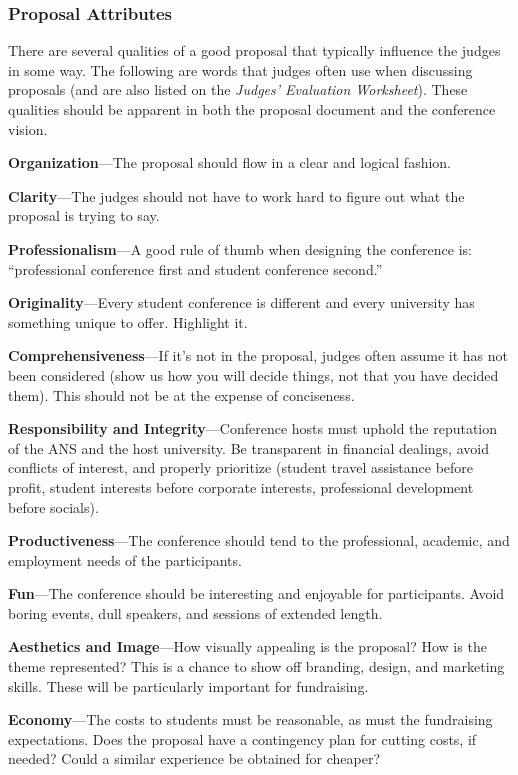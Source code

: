 \documentclass[12pt]{article}
\begin{document}
\subsubsection{Proposal Attributes}
There are several qualities of a good proposal that typically influence the judges in some way. The following are words that judges often use when discussing proposals (and are also listed on the \emph{Judges' Evaluation Worksheet}). These qualities should be apparent in both the proposal document and the conference vision.

\textbf{Organization}---The proposal should flow in a clear and logical fashion.

\textbf{Clarity}---The judges should not have to work hard to figure out what the proposal is trying to say.

\textbf{Professionalism}---A good rule of thumb when designing the conference is: “professional conference first and student conference second.”

\textbf{Originality}---Every student conference is different and every university has something unique to offer. Highlight it.

\textbf{Comprehensiveness}---If it’s not in the proposal, judges often assume it has not been considered (show us how you will decide things, not that you have decided them). This should not be at the expense of conciseness.

\textbf{Responsibility and Integrity}---Conference hosts must uphold the reputation of the ANS and the host university. Be transparent in financial dealings, avoid conflicts of interest, and properly prioritize (student travel assistance before profit, student interests before corporate
interests, professional development before socials).

\textbf{Productiveness}---The conference should tend to the professional, academic, and employment needs of the participants.

\textbf{Fun}---The conference should be interesting and enjoyable for participants. Avoid boring events, dull speakers, and sessions of extended length.

\textbf{Aesthetics and Image}---How visually appealing is the proposal? How is the theme represented? This is a chance to show off branding, design, and marketing skills. These will be particularly important for fundraising.

\textbf{Economy}---The costs to students must be reasonable, as must the fundraising expectations. Does the proposal have a contingency plan for cutting costs, if needed? Could a similar experience be obtained for cheaper?
\end{document}

